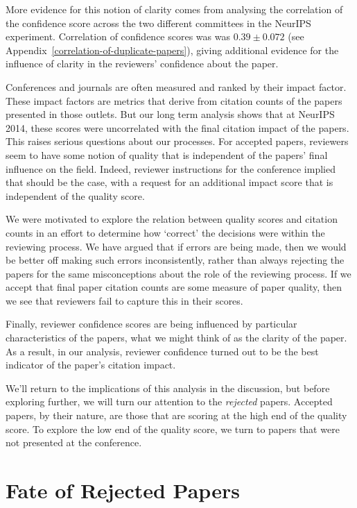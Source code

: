 \documentclass[twoside]{article}
\begin{document}
More evidence for this notion of clarity comes from analysing the
correlation of the confidence score across the two different
committees in the NeurIPS experiment. Correlation of confidence scores
was was $0.39 \pm 0.072$ (see Appendix~\ref{correlation-of-duplicate-papers}), giving additional evidence for
the influence of clarity in the reviewers' confidence about the paper.

Conferences and journals are often measured and ranked by their impact
factor. These impact factors are metrics that derive from citation
counts of the papers presented in those outlets. But our long term
analysis shows that at NeurIPS 2014, these scores were uncorrelated
with the final citation impact of the papers. This raises serious
questions about our processes. For accepted papers, reviewers seem to
have some notion of quality that is independent of the papers' final
influence on the field. Indeed, reviewer instructions for the
conference implied that should be the case, with a request for an
additional impact score that is independent of the quality score.

We were motivated to explore the relation between quality scores and
citation counts in an effort to determine how `correct' the decisions
were within the reviewing process. We have argued that if errors are
being made, then we would be better off making such errors
inconsistently, rather than always rejecting the papers for the same
misconceptions about the role of the reviewing process. If we accept
that final paper citation counts are some measure of paper quality,
then we see that reviewers fail to capture this in their scores.

Finally, reviewer confidence scores are being influenced by particular
characteristics of the papers, what we might think of as the clarity
of the paper. As a result, in our analysis, reviewer confidence turned
out to be the best indicator of the paper's citation impact.

We'll return to the implications of this analysis in the discussion,
but before exploring further, we will turn our attention to the
\emph{rejected} papers. Accepted papers, by their nature, are those
that are scoring at the high end of the quality score. To explore the
low end of the quality score, we turn to papers that were not
presented at the conference.

\section{Fate of Rejected Papers}
\end{document}
